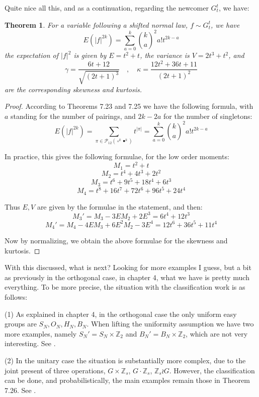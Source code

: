 \documentclass[12pt]{amsbook}
\newtheorem{theorem}{Theorem}[chapter]
\begin{document}
Quite nice all this, and as a continuation, regarding the newcomer $G_t^t$, we have:

\begin{theorem}
For a variable following a shifted normal law, $f\sim G_t^t$, we have
$$E(|f|^{2k})=\sum_{a=0}^k\binom{k}{a}^2a!t^{2k-a}$$
the expectation of $|f|^2$ is given by $E=t^2+t$, the variance is $V=2t^3+t^2$, and 
$$\gamma=\frac{6t+12}{\sqrt{(2t+1)^3}}
\quad,\quad \kappa=\frac{12t^2+36t+11}{(2t+1)^2}$$
are the corresponding skewness and kurtosis.
\end{theorem}

\begin{proof}
According to Theorems 7.23 and 7.25 we have the following formula, with $a$ standing for the number of pairings, and $2k-2a$ for the number of singletons:
$$E(|f|^{2k})=\sum_{\pi\in\mathcal P_{12}(\circ^k\bullet^k)}t^{|\pi|}
=\sum_{a=0}^k\binom{k}{a}^2a!t^{2k-a}$$

In practice, this gives the following formulae, for the low order moments:
$$M_1=t^2+t$$
$$M_2=t^4+4t^3+2t^2$$
$$M_3=t^6+9t^5+18t^4+6t^3$$
$$M_4=t^8+16t^7+72t^6+96t^5+24t^4$$

Thus $E,V$ are given by the formulae in the statement, and then:
$$M_3'=M_3-3EM_2+2E^3=6t^4+12t^3$$
$$M_4'=M_4-4EM_3+6E^2M_2-3E^4=12t^6+36t^5+11t^4$$

Now by normalizing, we obtain the above formulae for the skewness and kurtosis.
\end{proof}

With this discussed, what is next? Looking for more examples I guess, but a bit as previously in the orthogonal case, in chapter 4, what we have is pretty much everything. To be more precise, the situation with the classification work is as follows:

\bigskip

(1) As explained in chapter 4, in the orthogonal case the only uniform easy groups are $S_N,O_N,H_N,B_N$. When lifting the uniformity assumption we have two more examples, namely $S_N'=S_N\times\mathbb Z_2$ and $B_N'=B_N\times\mathbb Z_2$, which are not very interesting. See \cite{bsp}.

\bigskip

(2) In the unitary case the situation is substantially more complex, due to the joint present of three operations, $G\times\mathbb Z_s$, $G\cdot\mathbb Z_s$, $\mathbb Z_s\wr G$. However, the classification can be done, and probabilistically, the main examples remain those in Theorem 7.26. See \cite{twe}.
\end{document}

